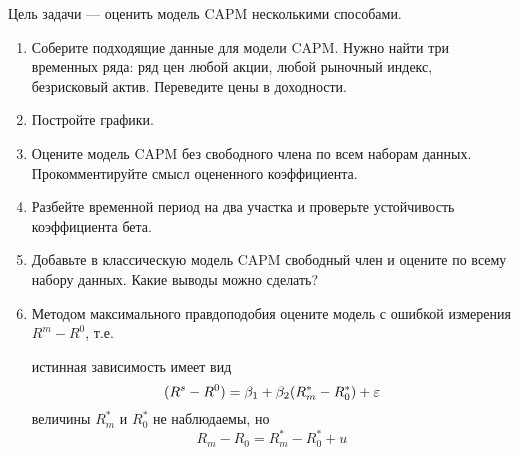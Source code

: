 \begin{problem} %
Цель задачи — оценить модель CAPM несколькими способами.
\begin{enumerate}
\item Соберите подходящие данные для модели CAPM. Нужно найти три временных ряда: ряд цен любой акции, любой рыночный индекс, безрисковый актив. Переведите цены в доходности.
\item Постройте графики.
\item Оцените модель CAPM без свободного члена по всем наборам данных. Прокомментируйте смысл оцененного коэффициента.
\item Разбейте временной период на два участка и проверьте устойчивость коэффициента бета.
\item Добавьте в классическую модель CAPM свободный член и оцените по всему набору данных. Какие выводы можно сделать?
\item Методом максимального правдоподобия оцените модель с ошибкой измерения $R^m-R^0$, т.е.

истинная зависимость имеет вид
\begin{equation*}
(R^s-R^0)=\beta_1+\beta_2(R_m^*-R_0^*)+\varepsilon
\end{equation*}
величины $R_m^*$ и $R_0^*$ не наблюдаемы, но
\begin{equation*}
R_m-R_0=R_m^*-R_0^*+u
\end{equation*}

\end{enumerate}


\begin{sol}
\end{sol}
\end{problem}


